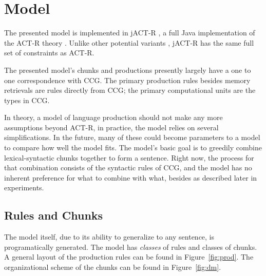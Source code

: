 \section{Model}
The presented model is implemented in jACT-R \citep{jactr}, a full Java implementation of the ACT-R theory \citep{actr}. Unlike other potential variants \citep{actup}, jACT-R has the same full set of constraints as ACT-R.  

The presented model's chunks and productions presently largely have a one to one correspondence with CCG. The primary production rules besides memory retrievals are rules directly from CCG; the primary computational units are the types in CCG.  

In theory, a model of language production should not make any more assumptions beyond ACT-R, in practice, the model relies on several simplifications. In the future, many of these could become parameters to a model to compare how well the model fits. The model's basic goal is to greedily combine lexical-syntactic chunks together to form a sentence. Right now, the process for that combination consists of the syntactic rules of CCG, and the model has no inherent preference for what to combine with what, besides as described later in experiments.

\subsection{Rules and Chunks}
The model itself, due to its ability to generalize to any sentence, is programatically generated. The model has \textit{classes} of rules and classes of chunks. A general layout of the production rules can be found in Figure~\ref{fig:prod}. The organizational scheme of the chunks can be found in Figure~\ref{fig:dm}.

